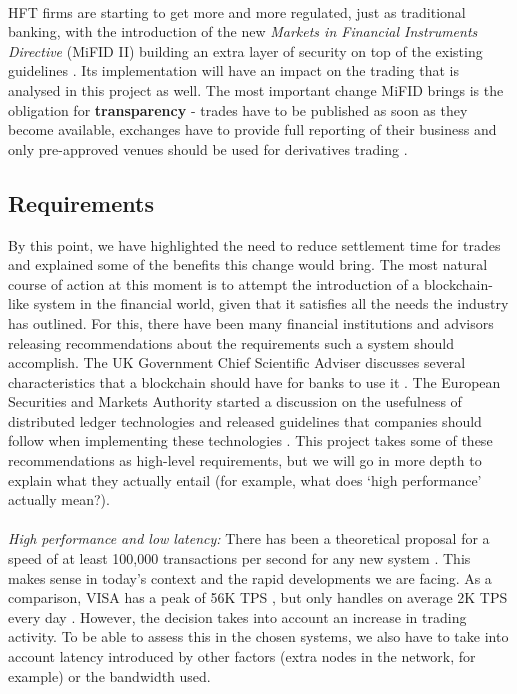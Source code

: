\documentclass[12pt,twoside]{article}
\begin{document}
\\
HFT firms are starting to get more and more regulated, just as traditional banking, with the introduction of the new \textit{Markets in Financial Instruments Directive} (MiFID II) building an extra layer of security on top of the existing guidelines \cite{mifid2}. Its implementation will have an impact on the trading that is analysed in this project as well. The most important change MiFID brings is the obligation for \textbf{transparency} \cite{transparency} - trades have to be published as soon as they become available, exchanges have to provide full reporting of their business and only pre-approved venues should be used for derivatives trading \cite{mifid2off}.

\subsection{Requirements}
\label{sub:Requirements}
By this point, we have highlighted the need to reduce settlement time for trades and explained some of the benefits this change would bring. The most natural course of action at this moment is to attempt the introduction of a blockchain-like system in the financial world, given that it satisfies all the needs the industry has outlined. For this, there have been many financial institutions and advisors releasing recommendations about the requirements such a system should accomplish. The UK Government Chief Scientific Adviser discusses several characteristics that a blockchain should have for banks to use it \cite{GOVReq}. The European Securities and Markets Authority started a discussion on the usefulness of distributed ledger technologies and released guidelines that companies should follow when implementing these technologies \cite{ESMA}. This project takes some of these recommendations as high-level requirements, but we will go in more depth to explain what they actually entail (for example, what does `high performance' actually mean?). 
\\ \\
\textit{High performance and low latency:} There has been a theoretical proposal for a speed of at least 100,000 transactions per second for any new system \cite{Chinese}. This makes sense in today's context and the rapid developments we are facing. As a comparison, VISA has a peak of 56K TPS \cite{visa}, but only handles on average 2K TPS every day \cite{Scalability}. However, the decision takes into account an increase in trading activity. To be able to assess this in the chosen systems, we also have to take into account latency introduced by other factors (extra nodes in the network, for example) or the bandwidth used. 
\end{document}

